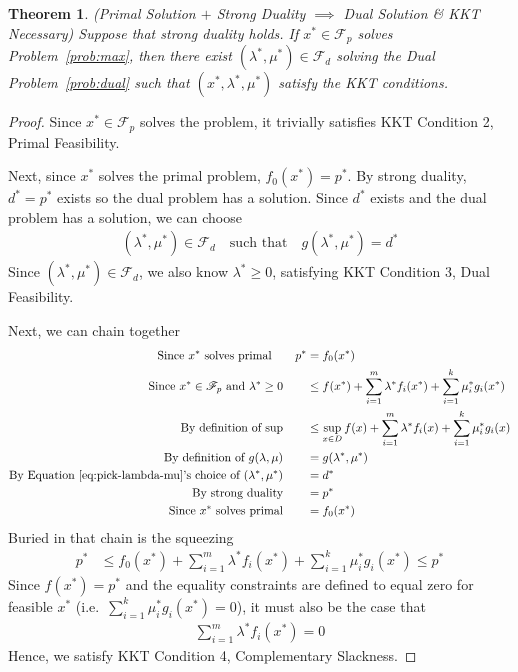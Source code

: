 \documentclass[12pt]{article}
\numberwithin{equation}{section} %
\theoremstyle{plain}
\newtheorem{thm}{Theorem}[section]
\theoremstyle{definition}
\theoremstyle{remark}
\begin{document}
\begin{thm}{\emph{(Primal Solution $+$ Strong Duality $\implies$ Dual
Solution \& KKT Necessary)}}
Suppose that strong duality holds.  If $x^*\in\mathscr{F}_p$ solves
Problem~\ref{prob:max}, then there exist
$(\lambda^*,\mu^*)\in\mathscr{F}_d$ solving the Dual
Problem~\ref{prob:dual} such that $(x^*,\lambda^*,\mu^*)$ satisfy the
KKT conditions.
\end{thm}
\begin{proof}
Since $x^*\in\mathscr{F}_p$ solves the problem, it trivially satisfies
KKT Condition 2, Primal Feasibility.

Next, since $x^*$ solves the primal problem, $f_0(x^*)=p^*$. By strong
duality, $d^*=p^*$ exists so the dual problem has a solution. Since
$d^*$ exists and the dual problem has a solution, we can choose
\begin{align}
  \label{eq:pick-lambda-mu}
  (\lambda^*,\mu^*) \in \mathscr{F}_d
  \quad \text{such that}
  \quad g(\lambda^*,\mu^*) = d^*
\end{align}
Since $(\lambda^*,\mu^*)\in\mathscr{F}_d$, we also know $\lambda^*\geq
0$, satisfying KKT Condition 3, Dual Feasibility.

Next, we can chain together
\begin{align*}
  \text{Since $x^*$ solves primal} \qquad p^* &= f_0(x^*) \\
  \text{Since $x^*\in\mathscr{F}_p$ and $\lambda^*\geq 0$} \qquad
  &\leq f(x^*) + \sum^m_{i=1} \lambda^* f_i(x^*)
  + \sum^k_{i=1} \mu_i^* g_i(x^*) \\
  \text{By definition of sup} \qquad
  &\leq \sup_{x\in D} f(x) + \sum^m_{i=1} \lambda^* f_i(x)
  + \sum^k_{i=1} \mu_i^* g_i(x) \\
  \text{By definition of $g(\lambda,\mu)$} \qquad
  &= g(\lambda^*,\mu^*) \\
  \text{By Equation~\ref{eq:pick-lambda-mu}'s
    choice of $(\lambda^*,\mu^*)$} \qquad &= d^* \\
  \text{By strong duality}\qquad
  &= p^*\\
  \text{Since $x^*$ solves primal}\qquad
  &= f_0(x^*)
\end{align*}
Buried in that chain is the squeezing
\begin{align*}
  p^*
  &\leq f_0(x^*) + \sum^m_{i=1} \lambda^* f_i(x^*)
  + \sum^k_{i=1} \mu_i^* g_i(x^*)
  \leq p^*
\end{align*}
Since $f(x^*)=p^*$ and the equality constraints are defined to equal
zero for feasible $x^*$ (i.e.\ $\sum^k_{i=1}\mu^*_ig_i(x^*)=0$), it must
also be the case that
\begin{align*}
  \sum^m_{i=1} \lambda^* f_i(x^*)
  =0
\end{align*}
Hence, we satisfy KKT Condition 4, Complementary Slackness.


\end{proof}
\end{document}
